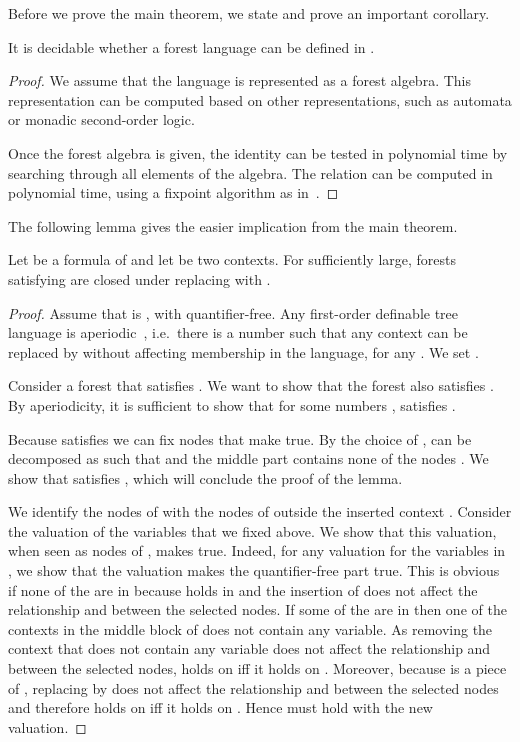 \documentclass{LMCS}
\begin{document}
Before we prove the main theorem, we state and prove
an important corollary.
\begin{cor}\label{cor:decid}
  It is decidable whether a forest language can be defined in \Dtwol.
\end{cor}
\begin{proof}
  We assume that the language is represented as a forest algebra. This
  representation can be computed based on other representations, such
  as automata or monadic second-order logic. 

  Once the forest algebra is given, the  identity can be
  tested in polynomial time by searching through all elements of the
  algebra. The relation  can be computed in polynomial time,
  using a fixpoint algorithm as in~\cite{fo2tree}.
\end{proof}



The following lemma gives the easier implication from the main theorem.

\begin{lem}\label{lemma:correctness}
  Let  be a formula of \Stwol and let  be two
contexts. For  sufficiently large, forests  satisfying  are closed under replacing
 with .
\end{lem}
\begin{proof}
  Assume that  is , with  quantifier-free.  Any first-order definable
  tree language is aperiodic~\cite{schutzenberger}, i.e.~there is a number  such that any
  context  can be replaced by  without affecting membership
  in the language, for any . We set .

 Consider a forest  that satisfies . We want to show that
 the forest  also satisfies . By aperiodicity, it
 is sufficient to show that 
 for some numbers ,  satisfies .

 Because  satisfies  we can fix  nodes 
 that make  true. By the choice of ,
  can be decomposed as  such that  and the
 middle  part contains none of the nodes . We show that
  satisfies , which will conclude the proof
 of the lemma.

 We identify the nodes of  with the nodes of  outside the inserted
 context .  Consider the valuation of the variables  that
 we fixed above. We show that this valuation, when seen as nodes of , makes
  true. Indeed, for any valuation for the variables 
 in , we show that the valuation makes the quantifier-free part 
 true. This is obvious if none of the  are in  because  holds
 in  and the insertion of  does not affect the relationship  and
  between the selected nodes.  If some of the  are in  then one
 of the contexts  in the middle block  of  does not contain any
 variable. As removing the context  that does not contain any variable does
 not affect the relationship  and  between the selected nodes, 
 holds on  iff it holds on .
 Moreover, because  is a piece of , replacing  by   does
 not affect the relationship  and  between the selected nodes and therefore
 holds on  iff it holds on .
 Hence  must hold with the new valuation.
\end{proof}
\end{document}
